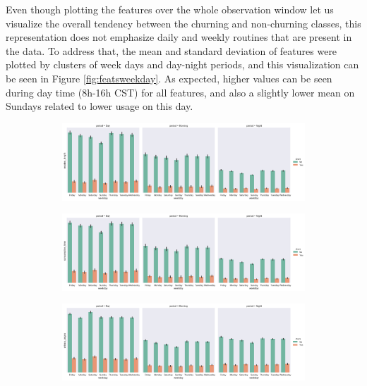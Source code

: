 \documentclass{kththesis}
\begin{document}
Even though plotting the features over the whole observation window let us visualize the overall tendency between the churning and non-churning classes, this representation does not emphasize daily and weekly routines that are present in the data. To address that, the mean and standard deviation of features were plotted by clusters of week days and day-night periods, and this visualization can be seen in Figure \ref{fig:featsweekday}. As expected, higher values can be seen during day time (8h-16h CST) for all features, and also a slightly lower mean on Sundays related to lower usage on this day.

	\begin{figure}[b]
	\centering
\begin{subfigure}{0.8\textwidth}
  \centering
    \includegraphics[width=1.0\textwidth, natwidth=580bp, natheight=313bp]{figures/sessionlength_vs_weekdays.png}
\end{subfigure}
\begin{subfigure}{0.8\textwidth}
  \centering
    \includegraphics[width=1.0\textwidth, natwidth=580bp, natheight=313bp]{figures/consumption_vs_weekdays.png}
\end{subfigure}    
\begin{subfigure}{0.8\textwidth}
  \centering
    \includegraphics[width=1.0\textwidth, natwidth=580bp, natheight=313bp]{figures/uniquepages_vs_weekdays.png}

\end{subfigure}
\end{figure}
\end{document}
